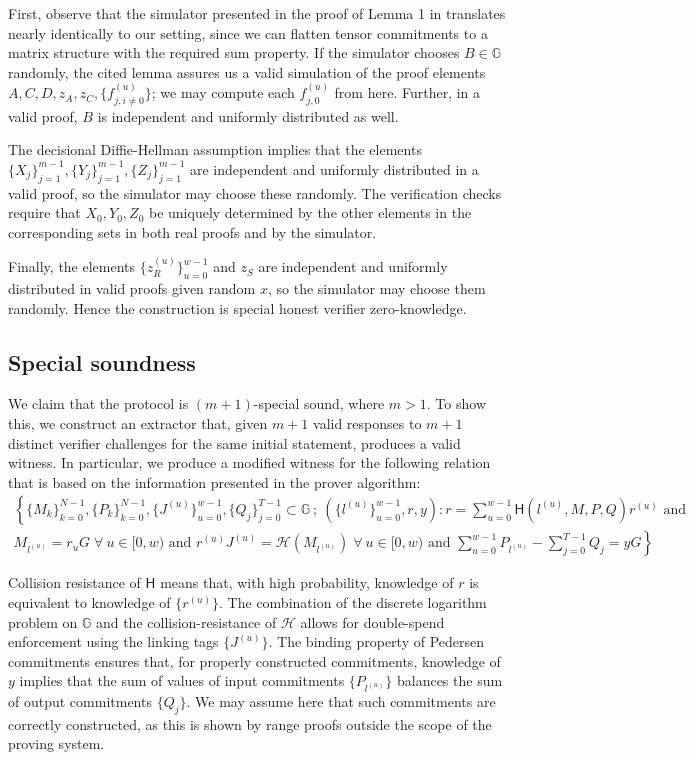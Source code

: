 \documentclass[draft]{article}
\newcommand{\G}{\mathbb{G}}
\newcommand{\hs}{\mathsf{H}}
\newcommand{\hp}{\mathcal{H}}
\begin{document}
First, observe that the simulator presented in the proof of Lemma 1 in \cite{bootle} translates nearly identically to our setting, since we can flatten tensor commitments to a matrix structure with the required sum property.
If the simulator chooses $B \in \G$ randomly, the cited lemma assures us a valid simulation of the proof elements $A,C,D,z_A,z_C,\{f^{(u)}_{j,i \neq 0}\}$; we may compute each $f^{(u)}_{j,0}$ from here.
Further, in a valid proof, $B$ is independent and uniformly distributed as well.

The decisional Diffie-Hellman assumption implies that the elements $\{X_j\}_{j=1}^{m-1}, \{Y_j\}_{j=1}^{m-1}, \{Z_j\}_{j=1}^{m-1}$ are independent and uniformly distributed in a valid proof, so the simulator may choose these randomly.
The verification checks require that $X_0,Y_0,Z_0$ be uniquely determined by the other elements in the corresponding sets in both real proofs and by the simulator.

Finally, the elements $\{z^{(u)}_R\}_{u=0}^{w-1}$ and $z_S$ are independent and uniformly distributed in valid proofs given random $x$, so the simulator may choose them randomly.
Hence the construction is special honest verifier zero-knowledge.


\subsection{Special soundness}
We claim that the protocol is $(m+1)$-special sound, where $m > 1$.
To show this, we construct an extractor that, given $m+1$ valid responses to $m+1$ distinct verifier challenges for the same initial statement, produces a valid witness.
In particular, we produce a modified witness for the following relation that is based on the information presented in the prover algorithm:
\begin{multline*}
\left\{ \{M_k\}_{k=0}^{N-1},\{P_k\}_{k=0}^{N-1},\{J^{(u)}\}_{u=0}^{w-1},\{Q_j\}_{j=0}^{T-1} \subset \G \: ; \: \left( \{l^{(u)}\}_{u=0}^{w-1}, r, y \right) : r = \sum_{u=0}^{w-1} \hs(l^{(u)},M,P,Q)r^{(u)} \text{ and } \right. \\
\left. M_{l^{(u)}} = r_uG \; \forall \: u \in [0,w) \text{ and } r^{(u)}J^{(u)} = \hp(M_{l^{(u)}}) \; \forall \: u \in [0,w) \text{ and } \sum_{u=0}^{w-1} P_{l^{(u)}} - \sum_{j=0}^{T-1} Q_j = yG \right\}
\end{multline*}

Collision resistance of $\hs$ means that, with high probability, knowledge of $r$ is equivalent to knowledge of $\{r^{(u)}\}$.
The combination of the discrete logarithm problem on $\G$ and the collision-resistance of $\hp$ allows for double-spend enforcement using the linking tags $\{J^{(u)}\}$.
The binding property of Pedersen commitments ensures that, for properly constructed commitments, knowledge of $y$ implies that the sum of values of input commitments $\{P_{l^{(u)}}\}$ balances the sum of output commitments $\{Q_j\}$.
We may assume here that such commitments are correctly constructed, as this is shown by range proofs outside the scope of the proving system.
\end{document}
